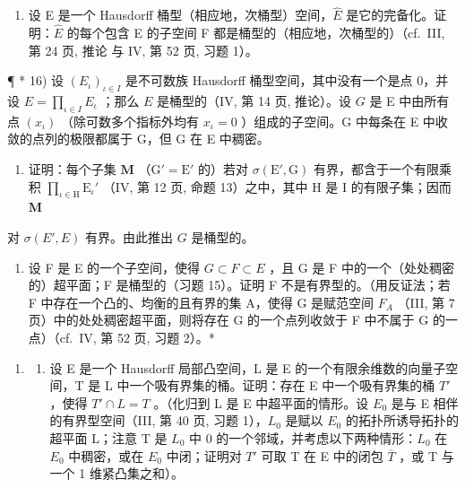 \begin{enumerate}
\def\labelenumi{\arabic{enumi})}
\setcounter{enumi}{14}
\tightlist
\item
  设 E 是一个 Hausdorff 桶型（相应地，次桶型）空间，\(\hat{E}\) 是它的完备化。证明：\(\hat{E}\) 的每个包含 E 的子空间 F 都是桶型的（相应地，次桶型的）（cf.~III, 第 24 页, 推论 与 IV, 第 52 页, 习题 1）。
\end{enumerate}

¶ * 16) 设 \((E_{\iota})_{\iota\in I}\) 是不可数族 Hausdorff 桶型空间，其中没有一个是点 0，并设 \(E = \prod_{\iota \in I} E_{\iota}\) ；那么 \(E\) 是桶型的（IV, 第 14 页, 推论）。设 \(G\) 是 E 中由所有点 \((x_{\iota})\) （除可数多个指标外均有 \(x_{\iota}=0\) ）组成的子空间。G 中每条在 E 中收敛的点列的极限都属于 G，但 G 在 E 中稠密。

\begin{enumerate}
\def\labelenumi{\alph{enumi})}
\tightlist
\item
  证明：每个子集 \(\mathbf{M}\) （\(\mathrm{G}' = \mathrm{E}'\) 的）若对 \(\sigma(\mathrm{E}', \mathrm{G})\) 有界，都含于一个有限乘积 \(\prod_{\iota \in \mathrm{H}} \mathrm{E}_{\iota}'\) （IV, 第 12 页, 命题 13）之中，其中 \(\mathrm{H}\) 是 I 的有限子集；因而 \(\mathbf{M}\)
\end{enumerate}

对 \(\sigma(E', E)\) 有界。由此推出 \(G\) 是桶型的。

\begin{enumerate}
\def\labelenumi{\alph{enumi})}
\setcounter{enumi}{1}
\tightlist
\item
  设 F 是 E 的一个子空间，使得 \(G \subset F \subset E\) ，且 G 是 F 中的一个（处处稠密的）超平面；F 是桶型的（习题 15）。证明 F 不是有界型的。（用反证法；若 F 中存在一个凸的、均衡的且有界的集 A，使得 G 是赋范空间 \(F_{A}\) （III, 第 7 页）中的处处稠密超平面，则将存在 G 的一个点列收敛于 F 中不属于 G 的一点）（cf.~IV, 第 52 页, 习题 2）。*
\end{enumerate}

\begin{enumerate}
\def\labelenumi{\arabic{enumi})}
\setcounter{enumi}{16}
\tightlist
\item
  \begin{enumerate}
  \def\labelenumii{\alph{enumii})}
  \tightlist
  \item
    设 E 是一个 Hausdorff 局部凸空间，L 是 E 的一个有限余维数的向量子空间，T 是 L 中一个吸有界集的桶。证明：存在 E 中一个吸有界集的桶 \(T'\) ，使得 \(T' \cap L = T\) 。（化归到 L 是 E 中超平面的情形。设 \(E_{0}\) 是与 E 相伴的有界型空间（III, 第 40 页, 习题 1），\(L_{0}\) 是赋以 \(E_{0}\) 的拓扑所诱导拓扑的超平面 L；注意 T 是 \(L_{0}\) 中 0 的一个邻域，并考虑以下两种情形：\(L_{0}\) 在 \(E_{0}\) 中稠密，或在 \(E_{0}\) 中闭；证明对 \(T'\) 可取 T 在 E 中的闭包 \(\overline{T}\) ，或 T 与一个 1 维紧凸集之和）。
  \end{enumerate}
\end{enumerate}

